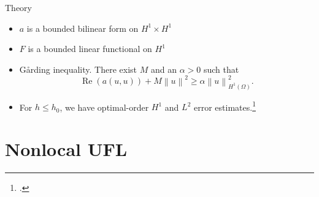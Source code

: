 \documentclass{beamer}
\begin{document}
\begin{frame}{Theory}
    \begin{itemize}
        \item<2-> $a$ is a bounded bilinear form on $H^1 \times H^1$
        \item<3-> $F$ is a bounded linear functional on $H^1$
        \item<4-> G{\aa}rding inequality. There exist $M$ and an $\alpha > 0$ such that
        \begin{equation*}
            \operatorname{Re}(a(u,u)) + M \left\| u \right\|^2 \geq \alpha \left\| u \right\|_{H^1(\Omega)}^2.
            \end{equation*}
        \item<5-> For $h \leq h_0$, we have optimal-order $H^1$ and $L^2$ error estimates.\footcite{kirby2021finite}
    \end{itemize}
\end{frame}

\section{Nonlocal UFL}
\end{document}
